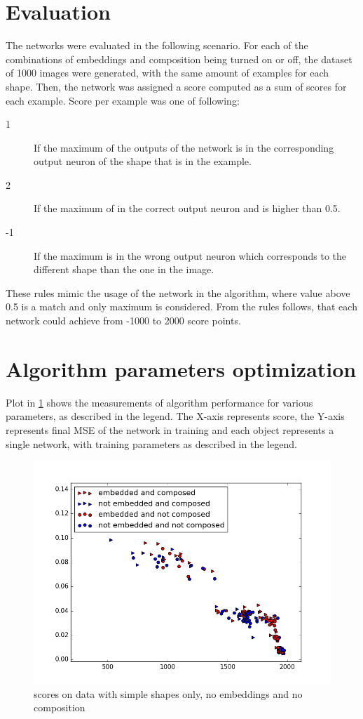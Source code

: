 \section{Evaluation}
The networks were evaluated in the following scenario. For each of the combinations of embeddings and composition being turned on or off, the dataset of 1000 images were generated, with the same amount of examples for each shape. Then, the network was assigned a score computed as a sum of scores for each example. Score per example was one of following:

\begin{description}
\item [1] If the maximum of the outputs of the network is in the corresponding output neuron of the shape that is in the example.
\item [2] If the maximum of in the correct output neuron and is higher than 0.5.
\item [-1] If the maximum is in the wrong output neuron which corresponds to the different shape than the one in the image.
\end{description}

These rules mimic the usage of the network in the algorithm, where value above 0.5 is a match and only maximum is considered. From the rules follows, that each network could achieve from -1000 to 2000 score points. 

\section{Algorithm parameters optimization}
Plot in \cref{fig:simples_com} shows the measurements of algorithm performance for various parameters, as described in the legend. The X-axis represents score, the Y-axis represents final MSE of the network in training and each object represents a single network, with training parameters as described in the legend.

\begin{figure}
\centering
\includegraphics[width=.8\linewidth]{ext/figure_simples_com.png}
\caption{scores on data with simple shapes only, no embeddings and no composition}
\label{fig:simples_com}
\end{figure}

